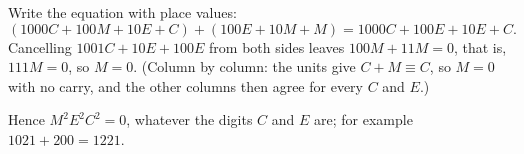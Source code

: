 Write the equation with place values:
\[
(1000C+100M+10E+C)+(100E+10M+M)=1000C+100E+10E+C .
\]
Cancelling $1001C+10E+100E$ from both sides leaves $100M+11M=0$, that is, $111M=0$, so $M=0$. (Column by column: the units give $C+M\equiv C$, so $M=0$ with no carry, and the other columns then agree for every $C$ and $E$.)

Hence $M^2E^2C^2=\boxed{0}$, whatever the digits $C$ and $E$ are; for example $1021+200=1221$.
